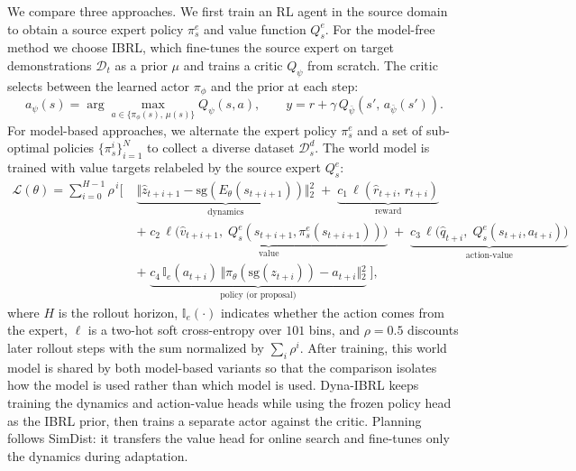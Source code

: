 \documentclass{article} %
\begin{document}
We compare three approaches. We first train an RL agent in the source domain to obtain a source expert policy $\pi_s^e$ and value function $Q_s^e$. For the model-free method we choose IBRL, which fine-tunes the source expert on target demonstrations $\mathcal{D}_t$ as a prior $\mu$ and trains a critic $Q_\psi$ from scratch. The critic selects between the learned actor $\pi_\phi$ and the prior at each step:
\begin{equation}
a_\psi(s) = \arg\max_{a \in \{\pi_\phi(s),\,\mu(s)\}} Q_\psi(s,a),
\qquad
y = r + \gamma\, Q_{\bar\psi}\!\left(s',\, a_{\bar\psi}(s')\right).
\label{eq:ibrl}
\end{equation}
For model-based approaches, we alternate the expert policy $\pi^e_s$ and a set of sub-optimal policies $\{\pi^i_s\}_{i=1}^N$ to collect a diverse dataset $\mathcal{D}_s^d$. The world model is trained with value targets relabeled by the source expert $Q_s^e$:
\begin{equation}
\begin{aligned}
\mathcal{L}(\theta) = \sum_{i=0}^{H-1} \rho^{\,i} \Big[\;
&\underbrace{\Vert{}\hat{z}_{t+i+1} - \text{sg}(E_\theta(s_{t+i+1}))\Vert{}_2^2}_{\text{dynamics}}
\;+\; \underbrace{c_1\, \ell(\hat{r}_{t+i},\, r_{t+i})}_{\text{reward}} \\[3pt]
&+\; \underbrace{c_2\, \ell\big(\hat{v}_{t+i+1},\; Q^{e}_{s}(s_{t+i+1},\pi_s^e(s_{t+i+1}))\big)}_{\text{value}}
\;+\; \underbrace{c_3\, \ell\big(\hat{q}_{t+i},\; Q^{e}_{s}(s_{t+i},a_{t+i})\big)}_{\text{action-value}}\\[3pt]
&+\; \underbrace{c_4\, \mathbb{I}_e(a_{t+i})\, \Vert{}\pi_\theta(\text{sg}(z_{t+i})) - a_{t+i}\Vert{}_2^2}_{\text{policy (or proposal)}} 
\;\Big],
\end{aligned}
\label{eq:simdist-distill}
\end{equation}
where $H$ is the rollout horizon, $\mathbb{I}_e(\cdot)$ indicates whether the action comes from the expert, $\ell$ is a two-hot soft cross-entropy over $101$ bins, and $\rho=0.5$ discounts later rollout steps with the sum normalized by $\sum_i \rho^i$. After training, this world model is shared by both model-based variants so that the comparison isolates how the model is used
rather than which model is used. Dyna-IBRL keeps training the dynamics and action-value heads while using the frozen policy head as the IBRL prior, then trains a separate actor against the critic. Planning follows SimDist: it transfers the value head for online search and fine-tunes only the dynamics during adaptation.
\end{document}
